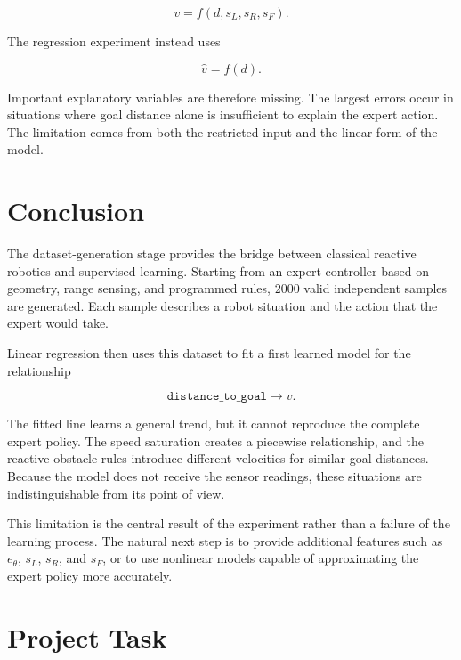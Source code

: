 \documentclass[10pt,twocolumn,a4paper]{article}
\begin{document}
\begin{equation}
    v=f(d,s_L,s_R,s_F).
    \label{eq:expert_feature_dependence}
\end{equation}

The regression experiment instead uses

\begin{equation}
    \hat{v}=f(d).
    \label{eq:reduced_feature_dependence}
\end{equation}

Important explanatory variables are therefore missing. The largest errors
occur in situations where goal distance alone is insufficient to explain the
expert action. The limitation comes from both the restricted input and the
linear form of the model.

\section{Conclusion}

The dataset-generation stage provides the bridge between classical reactive
robotics and supervised learning. Starting from an expert controller based on
geometry, range sensing, and programmed rules, $2000$ valid independent
samples are generated. Each sample describes a robot situation and the action
that the expert would take.

Linear regression then uses this dataset to fit a first learned model for the
relationship

\[
    \texttt{distance\_to\_goal}
    \longrightarrow
    v.
\]

The fitted line learns a general trend, but it cannot reproduce the complete
expert policy. The speed saturation creates a piecewise relationship, and the
reactive obstacle rules introduce different velocities for similar goal
distances. Because the model does not receive the sensor readings, these
situations are indistinguishable from its point of view.

This limitation is the central result of the experiment rather than a failure
of the learning process. The natural next step is to provide additional
features such as $e_\theta$, $s_L$, $s_R$, and $s_F$, or to use nonlinear
models capable of approximating the expert policy more accurately.

\section{Project Task}
\end{document}
